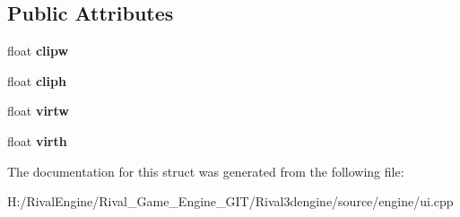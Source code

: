 \subsection*{Public Attributes}
\begin{DoxyCompactItemize}
\item 
\mbox{\label{struct_u_i_1_1_clipper_a2791a1ba5235ba0704fd145f0e22b287}} 
float {\bfseries clipw}
\item 
\mbox{\label{struct_u_i_1_1_clipper_a33816e87961c0d91cae4fa26b134181e}} 
float {\bfseries cliph}
\item 
\mbox{\label{struct_u_i_1_1_clipper_aade952bb3b84f4017e625308d4b41d5e}} 
float {\bfseries virtw}
\item 
\mbox{\label{struct_u_i_1_1_clipper_ac303b85908aac7609cc66d71d480d4a3}} 
float {\bfseries virth}
\end{DoxyCompactItemize}


The documentation for this struct was generated from the following file\+:\begin{DoxyCompactItemize}
\item 
H\+:/\+Rival\+Engine/\+Rival\+\_\+\+Game\+\_\+\+Engine\+\_\+\+G\+I\+T/\+Rival3dengine/source/engine/ui.\+cpp\end{DoxyCompactItemize}
